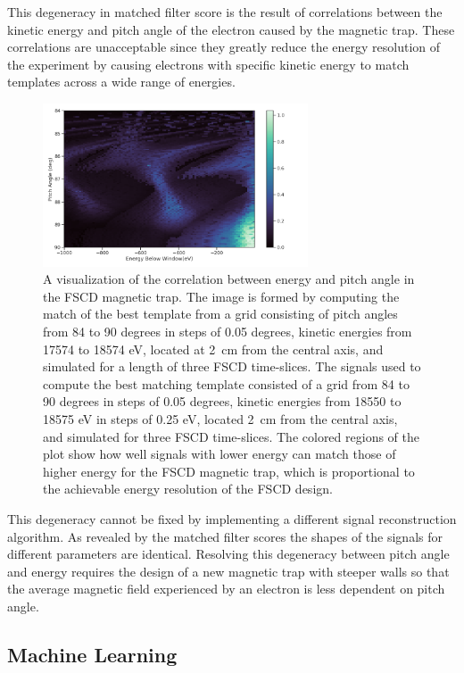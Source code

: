 This degeneracy in matched filter score is the result of correlations between the kinetic energy and pitch angle of the electron caused by the magnetic trap. These correlations are unacceptable since they greatly reduce the energy resolution of the experiment by causing electrons with specific kinetic energy to match templates across a wide range of energies.
\begin{figure}[htbp]
    \centering
    \includegraphics[width=0.7\textwidth]{figs/Chapter-4/230517_energy_pitch_correlation_map.png}
    \caption{A visualization of the correlation between energy and pitch angle in the FSCD magnetic trap. The image is formed by computing the match of the best template from a grid consisting of pitch angles from 84 to 90 degrees in steps of 0.05 degrees, kinetic energies from 17574 to 18574 eV, located at 2~cm from the central axis, and simulated for a length of three FSCD time-slices. The signals used to compute the best matching template consisted of a grid from 84 to 90 degrees in steps of 0.05 degrees, kinetic energies from 18550 to 18575 eV in steps of 0.25 eV, located 2~cm from the central axis, and simulated for three FSCD time-slices. The colored regions of the plot show how well signals with lower energy can match those of higher energy for the FSCD magnetic trap, which is proportional to the achievable energy resolution of the FSCD design.}
    \label{fig:chap4-mf-degeneracy-large-scale}
\end{figure}

This degeneracy cannot be fixed by implementing a different signal reconstruction algorithm. As revealed by the matched filter scores the shapes of the signals for different parameters are identical. Resolving this degeneracy between pitch angle and energy requires the design of a new magnetic trap with steeper walls so that the average magnetic field experienced by an electron is less dependent on pitch angle.

\subsection{Machine Learning}

